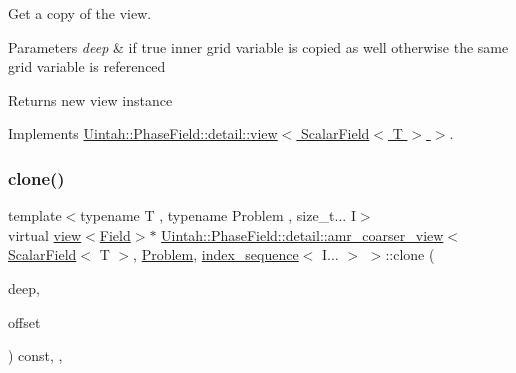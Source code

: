 Get a copy of the view. 


\begin{DoxyParams}{Parameters}
{\em deep} & if true inner grid variable is copied as well otherwise the same grid variable is referenced\\
\hline
\end{DoxyParams}
\begin{DoxyReturn}{Returns}
new view instance 
\end{DoxyReturn}


Implements \hyperlink{classUintah_1_1PhaseField_1_1detail_1_1view_3_01ScalarField_3_01T_01_4_01_4_a6e11243c9d776a7b703e524ea4151a16}{Uintah\+::\+Phase\+Field\+::detail\+::view$<$ Scalar\+Field$<$ T $>$ $>$}.

\mbox{\label{classUintah_1_1PhaseField_1_1detail_1_1amr__coarser__view_3_01ScalarField_3_01T_01_4_00_01Proble9cadea116dab5bdb44bb3e29abbe99ef_ac4654e84d3f8f4498e45eddfe0818370}} 
\subsubsection{\texorpdfstring{clone()}{clone()}\hspace{0.1cm}{\footnotesize\ttfamily [2/2]}}
{\footnotesize\ttfamily template$<$typename T , typename Problem , size\+\_\+t... I$>$ \\
virtual \hyperlink{classUintah_1_1PhaseField_1_1detail_1_1view}{view}$<$\hyperlink{structUintah_1_1PhaseField_1_1ScalarField}{Field}$>$$\ast$ \hyperlink{classUintah_1_1PhaseField_1_1detail_1_1amr__coarser__view}{Uintah\+::\+Phase\+Field\+::detail\+::amr\+\_\+coarser\+\_\+view}$<$ \hyperlink{structUintah_1_1PhaseField_1_1ScalarField}{Scalar\+Field}$<$ T $>$, \hyperlink{classUintah_1_1PhaseField_1_1Problem}{Problem}, \hyperlink{namespaceUintah_1_1PhaseField_a237de804d99512e50613aff7c94a9461}{index\+\_\+sequence}$<$ I... $>$ $>$\+::clone (\begin{DoxyParamCaption}\item[{bool}]{deep,  }\item[{const Int\+Vector \&}]{offset }\end{DoxyParamCaption}) const\hspace{0.3cm}{\ttfamily [inline]}, {\ttfamily [override]}, {\ttfamily [virtual]}}



